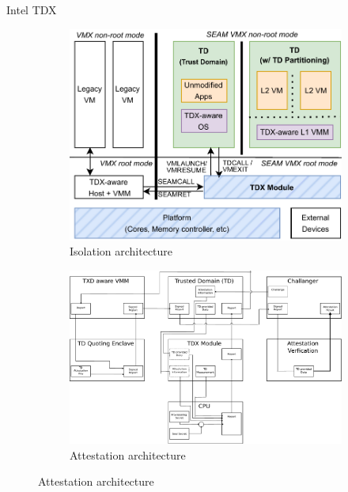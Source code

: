 \documentclass[aspectratio=169]{beamer}
\begin{document}
\begin{frame}{Intel TDX}
    \begin{figure}
        \begin{subfigure}[]{0.45\textwidth}
            \includegraphics[width=\textwidth]{images/tdx.png}
            \caption{Isolation architecture}
        \end{subfigure}
        \begin{subfigure}[]{0.45\textwidth}
            \includegraphics[width=\textwidth]{images/tdx_remote_attestation.pdf}
            \caption{Attestation architecture}
        \end{subfigure}
    \end{figure}
\end{frame}
\end{document}
